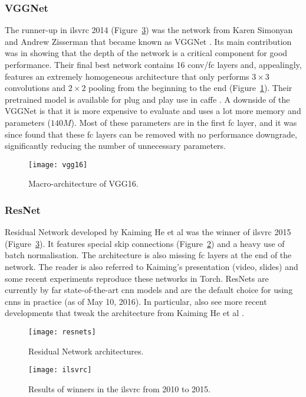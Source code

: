 \subsubsection{VGGNet}
The runner-up in \acrshort{ilsvrc} 2014 (Figure~\ref{fig:ilsvrcs}) was the
network from Karen Simonyan and Andrew Zisserman that became known as 
VGGNet \cite{DBLP:journals/corr/SimonyanZ14a}. Its main contribution was in
showing that the depth of the network is a critical component for good
performance. Their final best network contains 16 \acrshort{conv}/\acrshort{fc}
layers and, appealingly, features an extremely homogeneous architecture that
only performs $3\times3$ convolutions and $2\times2$ pooling from the beginning
to the end (Figure~\ref{fig:vgg16}). Their pretrained model is available for
plug and play use in \gls{caffe} \cite{jia2014caffe, caffe_model_zoo}. A
downside of the VGGNet is that it is more expensive to evaluate and uses a lot
more memory and parameters ($140M$). Most of these parameters are in the first
\acrshort{fc} layer, and it was since found that these \acrshort{fc} layers can
be removed with no performance downgrade, significantly reducing the number of
unnecessary parameters.
\begin{figure}[h]
    \centering
    \texttt{[image: vgg16]}
    \caption{Macro-architecture of VGG16.}
    \label{fig:vgg16}
\end{figure}

\subsubsection{ResNet}
Residual Network developed by Kaiming He et al \cite{DBLP:journals/corr/HeZRS15}
was the winner of \acrshort{ilsvrc} 2015 (Figure~\ref{fig:ilsvrcs}). It features
special skip connections (Figure~\ref{fig:resnets}) and a heavy use of batch
normalisation. The architecture is also missing \acrshort{fc} layers at the end
of the network. The reader is also referred to Kaiming's presentation (video,
slides) and some recent experiments reproduce these networks in Torch. ResNets
are currently by far state-of-the-art \acrfull{cnn} models and are the default
choice for using \acrshort{cnn}s in practice (as of May 10, 2016). In
particular, also see more recent developments that tweak the 
architecture from Kaiming He et al
\cite{DBLP:journals/corr/HeZR016}.
\begin{figure}[h]
    \centering
    \texttt{[image: resnets]}
    \caption{Residual Network architectures.}
    \label{fig:resnets}
\end{figure}
\begin{figure}[h]
    \centering
    \texttt{[image: ilsvrc]}
    \caption{Results of winners in the \acrfull{ilsvrc} from 2010 to 2015.}
    \label{fig:ilsvrcs}
\end{figure}
